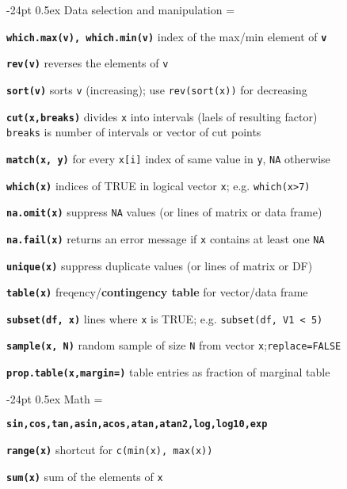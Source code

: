\documentclass[8pt,landscape]{article}
\makeatletter
\renewcommand\section{\@startsection{section}{1}{0mm}%
                                     {-24pt}%
                                     {0.5ex}%
                                {\color{blue}\normalfont\large\bfseries}}
\newcommand{\code}{\texttt}
\newcommand{\bcode}[1]{\texttt{\textbf{#1}}}
\makeatother
\begin{document}
\begin{multicols*}{3}
\vspace{-6ex}




\section{Data selection and manipulation}
\everypar={\hangindent=9mm}

\bcode{which.max(v), which.min(v)}  index of the max/min element of
\bcode{v}

\bcode{rev(v)}  reverses the elements of \code{v}

\bcode{sort(v)}  sorts \code{v} (increasing); use \code{rev(sort(x))} for decreasing

\bcode{cut(x,breaks)}  divides \code{x} into intervals (laels of resulting factor)\\ \code{breaks} is number of intervals or vector of cut points

\bcode{match(x, y)}  for every \code{x[i]} index of same value in \code{y}, \code{NA} otherwise

\bcode{which(x)}  indices of TRUE in logical vector \code{x}; e.g. \code{which(x>7)}

\bcode{na.omit(x)}  suppress \code{NA} values (or lines of matrix or data frame)

\bcode{na.fail(x)}  returns an error message if \code{x} contains at least one \code{NA}

\bcode{unique(x)}  suppress duplicate values (or lines of matrix or DF)

\bcode{table(x)}  freqency/{\bf contingency table} for vector/data frame

\bcode{subset(df, x)}  lines where \code{x} is TRUE; e.g. \code{subset(df, V1 < 5)}

\bcode{sample(x, N)}  random sample of size \code{N} from vector \code{x};\code{replace=FALSE}

\bcode{prop.table(x,margin=)} table entries as fraction of marginal table 




\section{Math}
\everypar={\hangindent=9mm}

\bcode{sin,cos,tan,asin,acos,atan,atan2,log,log10,exp}

\bcode{range(x)}  shortcut for \code{c(min(x), max(x))}

\bcode{sum(x)}  sum of the elements of \code{x}


\end{multicols*}
\end{document}
